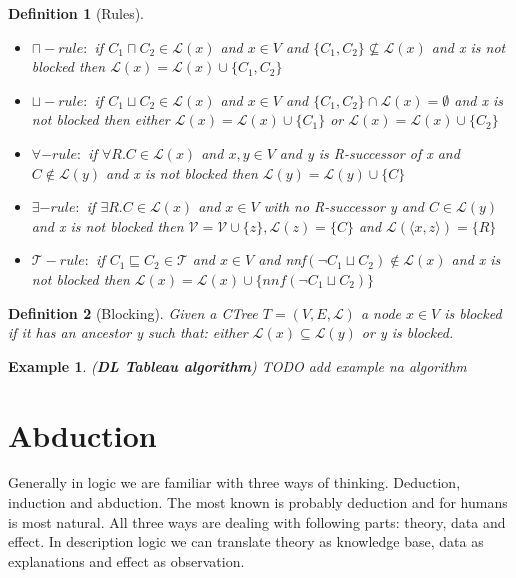\documentclass[12pt,a4paper]{article}
\newtheorem{definition}{Definition}[subsection]
\newtheorem{example}{Example}[subsection]
\begin{document}
\begin{definition}[Rules]
~\begin{itemize}
	\item $\sqcap-rule:$ if $C_{1} \sqcap C_{2} \in \mathcal{L}(x)$ and $x \in V$ and $\{ C_{1}, C_{2} \} \not \subseteq \mathcal{L}(x)$ and x is not blocked then $\mathcal{L}(x) = \mathcal{L}(x) \cup \{ C_{1}, C_{2} \}$
	
	\item $\sqcup-rule:$ if $C_{1} \sqcup C_{2} \in \mathcal{L}(x)$ and $x \in V$ and $ \{ C_{1}, C_{2} \} \cap \mathcal{L}(x) = \emptyset$ and x is not blocked then either $\mathcal{L}(x) = \mathcal{L}(x) \cup \{ C_{1} \}$ or $\mathcal{L}(x) = \mathcal{L}(x) \cup \{ C_{2} \}$
	
	\item $\forall-rule:$ if $\forall R.C \in \mathcal{L}(x)$ and $x,y \in V$ and y is R-successor of x and $C \not \in \mathcal{L}(y)$ and x is not blocked then $\mathcal{L}(y) = \mathcal{L}(y) \cup \{ C \}$
	
	\item $\exists-rule:$ if $\exists R.C \in \mathcal{L}(x)$ and $x \in V$ with no R-successor y and $C \in \mathcal{L}(y)$ and x is not blocked then $\mathcal{V} = \mathcal{V} \cup \{ z \}, \mathcal{L}(z) = \{ C\}$ and $\mathcal{L}( \langle x, z \rangle ) = \{ R \}$
	
	\item $\mathcal{T}-rule:$ if $C_{1} \sqsubseteq C_{2} \in \mathcal{T}$ and $x \in V$ and nnf$(\neg C_{1} \sqcup C_{2}) \not \in \mathcal{L}(x)$ and x is not blocked then $\mathcal{L}(x) = \mathcal{L}(x) \cup \{ nnf(\neg C_{1} \sqcup C_{2}) \}$
\end{itemize}
\end{definition}

\begin{definition}[Blocking]
Given a CTree $T = (V, E, \mathcal{L})$ a node $x \in V$ is blocked if it has an ancestor y such that: either $\mathcal{L}(x) \subseteq \mathcal{L}(y)$ or y is blocked.

\end{definition}

\begin{example}{(\textbf{DL Tableau algorithm})}
 TODO add example na algorithm
\end{example}

\section{Abduction}
Generally in logic we are familiar with three ways of thinking. Deduction, induction and abduction. The most known is probably deduction and for humans is most natural. All three ways are dealing with following parts: theory, data and effect. In description logic we can translate theory as knowledge base, data as explanations and  effect as observation.
\end{document}
